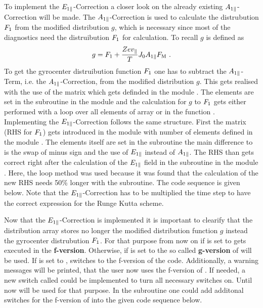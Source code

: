 \newpage
To implement the $E_{1\parallel}$-Correction a closer look on the already existing $A_{1\parallel}$-Correction will be made. The $A_{1\parallel}$-Correction is used to calculate the distrubution $F_1$ from the modified distribution $g$, which is necessary since most of the diagnostics need the distruibution $F_1$ for calculation. To recall $g$ is defined as
\begin{gather}
	g = F_1 + \frac{Ze v_\parallel}{T} J_0 A_{1\parallel} F_\mathrm{M} ~.
	\label{eq:modifiedDistrubutionFunctionRecall}
\end{gather}
To get the gyrocenter distruibution function $F_1$ one has to subtract the $A_{1\parallel}$-Term, i.e. the $A_{1\parallel}$-Correction, from the modified distribution $g$. This gets realised with the use of the matrix  which gets definded in the module . The elements are set in the subroutine  in the module  and the calculation for $g$ to $F_1$ gets either performed with a loop over all elements of array  or in the function . Implementing the $E_{1\parallel}$-Correction follows the same structure. First the matrix  (RHS for $F_1$) gets introduced in the module  with  number of elements defined in the module . The elements itself are set in the subroutine  the main difference to  is the swap of minus sign and the use of $E_{1\parallel}$ instead of $A_{1\parallel}$. The RHS than gets correct right after the calculation of the $E_{1\parallel}$ field in the subroutine  in the module . Here, the loop method was used because it was found that the calculation of the new RHS needs 50\% longer with the  subroutine. The code sequence is given below. Note that the $E_{1\parallel}$-Correction has to be multiplied the time step  to have the correct expression for the Runge Kutta scheme.



Now that the $E_{1\parallel}$-Correction is implemented it is important to clearify that the distribution array  stores no longer the modified distribution function $g$ instead the gyrocenter distrubution $F_1$. For that purpose from now on if  is set to  {\gkw} gets executed in the \textbf{f-version}. Otherwise, if  is set to  the so called \textbf{g-version} of {\gkw} will be used. If  is set to , {\gkw} switches to the f-version of the code. Additionally, a warning messages will be printed, that the user now uses the f-version of {\gkw}. If needed, a new switch called  could be implemented to turn all necessary switches on. Until now  will be used for that purpose. In the subroutine  one could add additonal switches for the f-version of {\gkw} into the given code sequence below.


